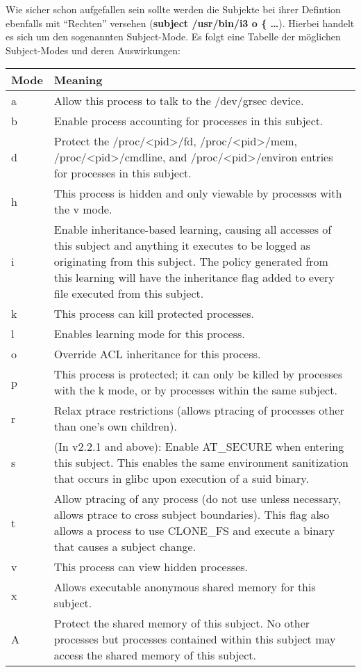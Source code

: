 Wie sicher schon aufgefallen sein sollte werden die Subjekte bei ihrer Defintion ebenfalls mit "`Rechten"' versehen (\textbf{subject /usr/bin/i3 o \{ \dots}). Hierbei handelt es sich um den sogenannten Subject-Mode. Es folgt eine Tabelle der möglichen Subject-Modes und deren Auswirkungen:\\
\begin{tabular}{|lp{13cm}|}
\hline
Mode & Meaning \\
\hline
a & Allow this process to talk to the /dev/grsec device.\\
b & Enable process accounting for processes in this subject.\\
d & Protect the /proc/\textless pid\textgreater /fd, /proc/\textless pid\textgreater /mem, /proc/\textless pid\textgreater /cmdline, and /proc/\textless pid\textgreater /environ entries for processes in this subject.\\
h & This process is hidden and only viewable by processes with the v mode.\\
i & Enable inheritance-based learning, causing all accesses of this subject and anything it executes to be logged as originating from this subject. The policy generated from this learning will have the inheritance flag added to every file executed from this subject.\\
k & This process can kill protected processes.\\
l & Enables learning mode for this process.\\
o & Override ACL inheritance for this process.\\
p & This process is protected; it can only be killed by processes with the k mode, or by processes within the same subject.\\
r & Relax ptrace restrictions (allows ptracing of processes other than one's own children).\\
s & (In v2.2.1 and above): Enable AT\_SECURE when entering this subject. This enables the same environment sanitization that occurs in glibc upon execution of a suid binary.\\
t & Allow ptracing of any process (do not use unless necessary, allows ptrace to cross subject boundaries). This flag also allows a process to use CLONE\_FS and execute a binary that causes a subject change.\\
v & This process can view hidden processes.\\
x & Allows executable anonymous shared memory for this subject.\\
A & Protect the shared memory of this subject. No other processes but processes contained within this subject may access the shared memory of this subject.\\

\end{tabular}
